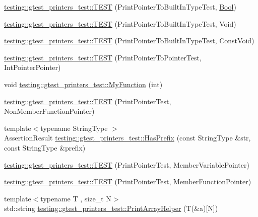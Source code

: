 \begin{DoxyCompactItemize}
\item 
\mbox{\hyperlink{namespacetesting_1_1gtest__printers__test_ad08dcd672b1e66a802a564eb974c400a}{testing\+::gtest\+\_\+printers\+\_\+test\+::\+T\+E\+ST}} (Print\+Pointer\+To\+Built\+In\+Type\+Test, \mbox{\hyperlink{struct_bool}{Bool}})
\item 
\mbox{\hyperlink{namespacetesting_1_1gtest__printers__test_ac6d8b84db9386b399eb431b5b1668e87}{testing\+::gtest\+\_\+printers\+\_\+test\+::\+T\+E\+ST}} (Print\+Pointer\+To\+Built\+In\+Type\+Test, Void)
\item 
\mbox{\hyperlink{namespacetesting_1_1gtest__printers__test_a8819fb42392faae72e8bc594d498085d}{testing\+::gtest\+\_\+printers\+\_\+test\+::\+T\+E\+ST}} (Print\+Pointer\+To\+Built\+In\+Type\+Test, Const\+Void)
\item 
\mbox{\hyperlink{namespacetesting_1_1gtest__printers__test_afee54807b15b623718c62008bd743d4b}{testing\+::gtest\+\_\+printers\+\_\+test\+::\+T\+E\+ST}} (Print\+Pointer\+To\+Pointer\+Test, Int\+Pointer\+Pointer)
\item 
void \mbox{\hyperlink{namespacetesting_1_1gtest__printers__test_adf0e590d6776ecb7095a989ff2272d7b}{testing\+::gtest\+\_\+printers\+\_\+test\+::\+My\+Function}} (int)
\item 
\mbox{\hyperlink{namespacetesting_1_1gtest__printers__test_aa3cb60cf6f3a4a0cd7d9873cd597ffd8}{testing\+::gtest\+\_\+printers\+\_\+test\+::\+T\+E\+ST}} (Print\+Pointer\+Test, Non\+Member\+Function\+Pointer)
\item 
{\footnotesize template$<$typename String\+Type $>$ }\\Assertion\+Result \mbox{\hyperlink{namespacetesting_1_1gtest__printers__test_abbd436200da6c80944c8a7504fb56ea1}{testing\+::gtest\+\_\+printers\+\_\+test\+::\+Has\+Prefix}} (const String\+Type \&str, const String\+Type \&prefix)
\item 
\mbox{\hyperlink{namespacetesting_1_1gtest__printers__test_a434cafcc1dbee409992bbb1593034480}{testing\+::gtest\+\_\+printers\+\_\+test\+::\+T\+E\+ST}} (Print\+Pointer\+Test, Member\+Variable\+Pointer)
\item 
\mbox{\hyperlink{namespacetesting_1_1gtest__printers__test_a9d998b210890d3d7e085d01c457f650f}{testing\+::gtest\+\_\+printers\+\_\+test\+::\+T\+E\+ST}} (Print\+Pointer\+Test, Member\+Function\+Pointer)
\item 
{\footnotesize template$<$typename T , size\+\_\+t N$>$ }\\std\+::string \mbox{\hyperlink{namespacetesting_1_1gtest__printers__test_a694f23c5a8c134f0e6e24a412f8d75c1}{testing\+::gtest\+\_\+printers\+\_\+test\+::\+Print\+Array\+Helper}} (T(\&a)\mbox{[}N\mbox{]})

\end{DoxyCompactItemize}
